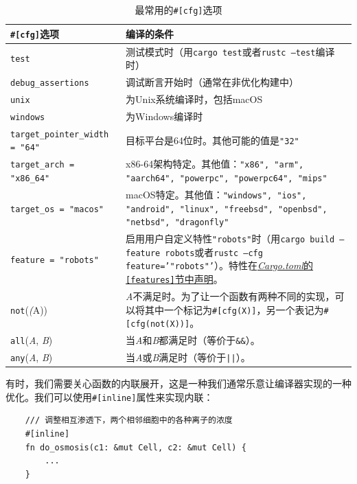 \begin{table}[htbp]
    \centering
    \caption{最常用的\texttt{\#[cfg]}选项}
    \label{t8-2}
    \begin{tabular}{p{}p{}}
        \hline
        \textbf{\texttt{\#[cfg]}选项}   & \textbf{编译的条件} \\
        \hline
        \texttt{test}   & 测试模式时（用\texttt{cargo test}或者\texttt{rustc --test}编译时） \\
        \rowcolor{tablecolor}
        \texttt{debug\_assertions} & 调试断言开始时（通常在非优化构建中） \\
        \texttt{unix}   & 为Unix系统编译时，包括macOS \\
        \rowcolor{tablecolor}
        \texttt{windows}& 为Windows编译时 \\
        \texttt{target\_pointer\_width = "64"} & 目标平台是64位时。其他可能的值是\texttt{"32"} \\
        \rowcolor{tablecolor}
        \texttt{target\_arch = "x86\_64"} & x86-64架构特定。其他值：\texttt{"x86", "arm", "aarch64", "powerpc", "powerpc64", "mips"} \\
        \texttt{target\_os = "macos"} & macOS特定。其他值：\texttt{"windows", "ios", "android", "linux", "freebsd", "openbsd", "netbsd", "dragonfly"} \\
        \rowcolor{tablecolor}
        \texttt{feature = "robots"} & 启用用户自定义特性\texttt{"robots"}时（用\texttt{cargo build --feature robots}或者\texttt{rustc --cfg feature='"robots"'}）。特性在\href{https://doc.rust-lang.org/cargo/reference/manifest.html}{\emph{Cargo.toml}的\texttt{[features]}节中声明}。 \\
        \texttt{not}(\emph(A)) & \emph{A}不满足时。为了让一个函数有两种不同的实现，可以将其中一个标记为\texttt{\#[cfg(X)]}，另一个表记为\texttt{\#[cfg(not(X))]}。 \\
        \rowcolor{tablecolor}
        \texttt{all}(\emph{A}, \emph{B}) & 当\emph{A}和\emph{B}都满足时（等价于\texttt{\&\&}）。 \\
        \texttt{any}(\emph{A}, \emph{B}) & 当\emph{A}或\emph{B}满足时（等价于\texttt{||}）。 \\
    \end{tabular}
\end{table}

有时，我们需要关心函数的内联展开，这是一种我们通常乐意让编译器实现的一种优化。我们可以使用\texttt{\#[inline]}属性来实现内联：
\begin{verbatim}
    /// 调整相互渗透下，两个相邻细胞中的各种离子的浓度
    #[inline]
    fn do_osmosis(c1: &mut Cell, c2: &mut Cell) {
        ...
    }
\end{verbatim}

